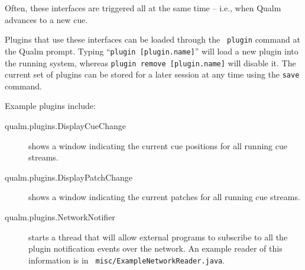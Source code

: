 \documentclass{article}
\newcommand{\q}{{\textsf{Qualm}}\xspace}
\begin{document}
Often, these interfaces are triggered all at the same time -- i.e.,
when \q advances to a new cue.

Plugins that use these interfaces can be loaded through the {\tt
  plugin} command at the \q prompt.  Typing ``{\tt plugin
  [plugin.name]}'' will load a new plugin into the running system,
whereas {\tt plugin remove [plugin.name]} will disable it.  The
current set of plugins can be stored for a later session at any time
using the {\tt save} command.

Example plugins include:

\begin{description}
\item[qualm.plugins.DisplayCueChange] shows a window indicating the
  current cue positions for all running cue streams.
\item[qualm.plugins.DisplayPatchChange] shows a window indicating the
  current patches for all running cue streams.
\item[qualm.plugins.NetworkNotifier] starts a thread that will allow
  external programs to subscribe to all the plugin notification events
  over the network.  An example reader of this information is in {\tt
    misc/ExampleNetworkReader.java}.
\end{description}

\newpage
\printindex
\end{document}
